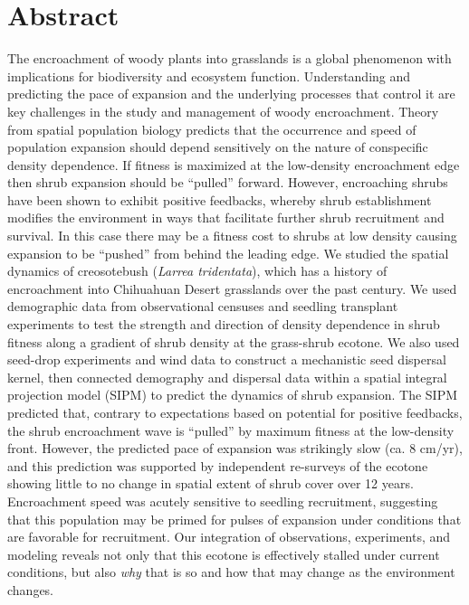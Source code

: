\documentclass[11pt]{article}\usepackage[]{graphicx}\usepackage[usenames,dvipsnames]{xcolor}
\begin{document}
\section*{Abstract}
The encroachment of woody plants into grasslands is a global phenomenon with implications for biodiversity and ecosystem function. 
Understanding and predicting the pace of expansion and the underlying processes that control it are key challenges in the study and management of woody encroachment.
Theory from spatial population biology predicts that the occurrence and speed of population expansion should depend sensitively on the nature of conspecific density dependence.
If fitness is maximized at the low-density encroachment edge then shrub expansion should be ``pulled'' forward.
However, encroaching shrubs have been shown to exhibit positive feedbacks, whereby shrub establishment modifies the environment in ways that facilitate further shrub recruitment and survival. 
In this case there may be a fitness cost to shrubs at low density causing expansion to be ``pushed'' from behind the leading edge.
We studied the spatial dynamics of creosotebush (\textit{Larrea tridentata}), which has a history of encroachment into Chihuahuan Desert grasslands over the past century.
We used demographic data from observational censuses and seedling transplant experiments to test the strength and direction of density dependence in shrub fitness along a gradient of shrub density at the grass-shrub ecotone. 
We also used seed-drop experiments and wind data to construct a mechanistic seed dispersal kernel, then connected demography and dispersal data within a spatial integral projection model (SIPM) to predict the dynamics of shrub expansion.
The SIPM predicted that, contrary to expectations based on potential for positive feedbacks, the shrub encroachment wave is ``pulled'' by maximum fitness at the low-density front.
However, the predicted pace of expansion was strikingly slow (ca. 8 cm/yr), and this prediction was supported by independent re-surveys of the ecotone showing little to no change in spatial extent of shrub cover over 12 years. 
Encroachment speed was acutely sensitive to seedling recruitment, suggesting that this population may be primed for pulses of expansion under conditions that are favorable for recruitment.
Our integration of observations, experiments, and modeling reveals not only that this ecotone is effectively stalled under current conditions, but also \emph{why} that is so and how that may change as the environment changes. 

\end{document}
